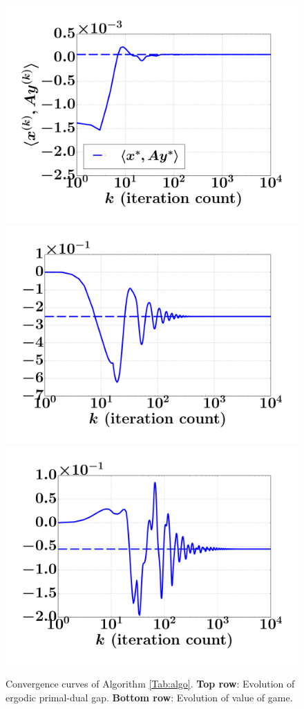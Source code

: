 \documentclass[envcountsame]{llcns2e/llncs}
\begin{document}
\begin{figure}[!htpb]
  \hspace{-2em}
  \hspace{-2em}
  \vspace{-1em}
  \hspace{-1em}
  \includegraphics[width=.34\linewidth]{simplex_NE.pdf}
  \hspace{-1em}
  \includegraphics[width=.33\linewidth]{SimplifiedPoker_NE.pdf}
  \hspace{-1em}
  \includegraphics[width=.33\linewidth]{Kuhn3112_NE.pdf}
  \caption{Convergence curves of Algorithm
    \ref{Tab:algo}. \textbf{Top row}: Evolution of ergodic
    primal-dual gap. \textbf{Bottom row}: Evolution of
    value of game.}
  \label{Tab:dgap_curve}
\end{figure}
\end{document}
